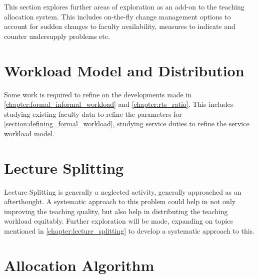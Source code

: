 
This section explores further areas of exploration as an add-on to the teaching allocation system. This includes on-the-fly change management options to account for sudden changes to faculty availability, measures to indicate and counter undersupply problems etc.

\section{Workload Model and Distribution}
Some work is required to refine on the developments made in \autoref{chapter:formal_informal_workload} and \autoref{chapter:rts_ratio}. This includes studying existing faculty data to refine the parameters for \autoref{section:defining_formal_workload}, studying service duties to refine the service workload model.

\section{Lecture Splitting}

Lecture Splitting is generally a neglected activity, generally approached as an afterthought. A systematic approach to this problem could help in not only improving the teaching quality, but also help in distributing the teaching workload equitably. Further exploration will be made, expanding on topics mentioned in \autoref{chapter:lecture_splitting} to develop a systematic approach to this.

\section{Allocation Algorithm}



